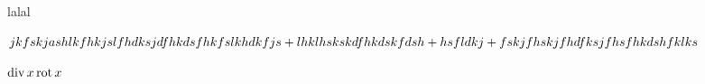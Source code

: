 \documentclass{article}
\begin{document}
    
    \fsrheader
    
    \begin{thm}
        lalal
    \end{thm}
    
    
    $jkfskjashlkfhkjslfhdksjdfhkdsfhkfslkhdkfjs+lhklhskskdfhkdskfdsh\hm+ hsfldkj\hm+fskjfhskjfhdfksjfhsfhkdshfklks$
    
    $\mathop{\operatorname{div}} x \operatorname{rot} x$
    
\end{document}
